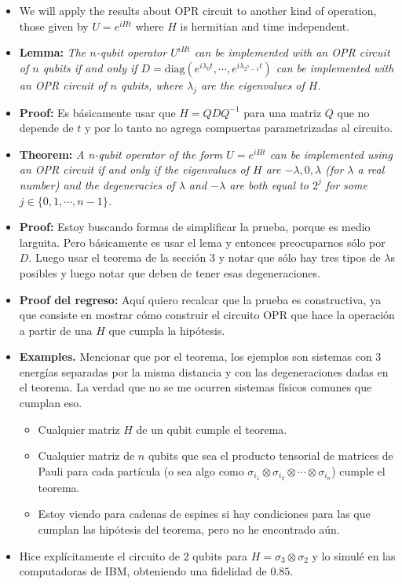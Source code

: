 \documentclass[10pt,letterpaper]{article} %
\begin{document}
\begin{itemize}
\item We will apply the results about OPR circuit to another kind of operation, those given by $U  = e^{iHt}$ where $H$ is hermitian  and time independent.
\item \textbf{Lemma:}\textit{ The $n$-qubit operator $U^{iHt}$ can be implemented with an OPR circuit of $n$ qubits if and only if $D = \text{diag}(e^{i\lambda_0 t}, \cdots, e^{i \lambda_{2^n-1}t})$ can be implemented with an OPR circuit of $n$ qubits, where $\lambda_j$ are the eigenvalues of $H$.}
\item \textbf{Proof:}  Es b\'asicamente usar que $H = QDQ^{-1}$ para una matriz $Q$ que no depende de $t$ y por lo tanto no agrega compuertas parametrizadas al circuito. 
\item \textbf{Theorem:} \textit{ A n-qubit operator of the form $U = e^{iHt}$ can be implemented using an OPR circuit if and only if the eigenvalues of $H$ are $-\lambda,0,\lambda$ (for $\lambda$ a real number) and the degeneracies of $\lambda$ and $-\lambda$ are both equal to $2^j$ for some $j\in \{0,1,\cdots,n-1\}$.}
\item \textbf{Proof:} Estoy buscando formas de simplificar la prueba, porque es medio larguita. Pero básicamente es usar el lema y entonces preocuparnos sólo por $D$. Luego  usar el teorema de la sección 3 y notar que sólo hay tres tipos de  $\lambda$s posibles y luego notar que deben de tener esas degeneraciones.
\item \textbf{Proof del regreso:} Aquí quiero recalcar que la prueba es constructiva, ya que consiste en mostrar cómo construir el circuito OPR que hace la operación a partir de una $H$ que cumpla la hipótesis. 
\item \textbf{Examples.} Mencionar que por el teorema, los ejemplos son sistemas con 3 energías separadas por la misma distancia y con las degeneraciones dadas en el teorema. 
La verdad que no se me ocurren sistemas físicos comunes que cumplan eso.
\begin{itemize}
\item Cualquier matriz $H$ de un qubit cumple el teorema.
\item Cualquier matriz de $n$ qubits que sea el producto tensorial de matrices de Pauli para cada partícula (o sea algo como $\sigma_{i_1} \otimes \sigma_{i_2} \otimes \cdots \otimes \sigma_{i_n}$) cumple el teorema.
\item Estoy viendo para cadenas de espines si hay condiciones para las que cumplan las hipótesis del teorema, pero no he encontrado aún.
\end{itemize}
\item Hice explícitamente el circuito de 2 qubits para $H = \sigma_3 \otimes \sigma_2$ y lo simulé en las computadoras de IBM, obteniendo una fidelidad de $0.85$.
\end{itemize}
\end{document}
